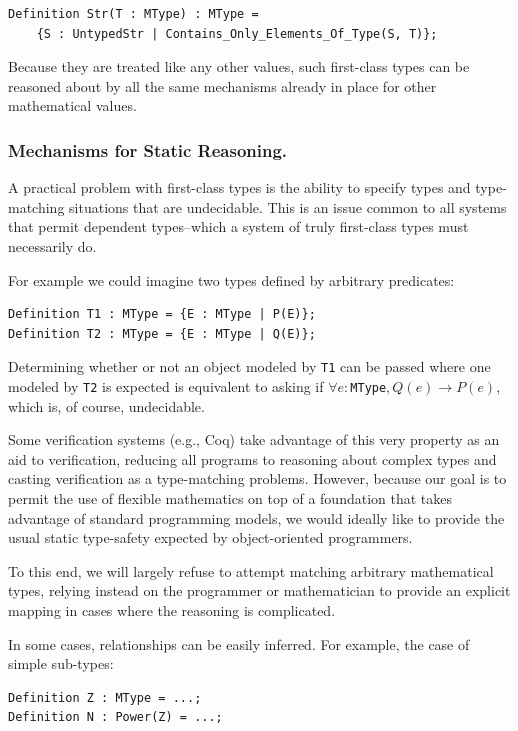 \begin{lstlisting}
Definition Str(T : MType) : MType = 
	{S : UntypedStr | Contains_Only_Elements_Of_Type(S, T)};
\end{lstlisting}

Because they are treated like any other values, such first-class types can be reasoned about by all the same mechanisms already in place for other mathematical values.

\subsubsection{Mechanisms for Static Reasoning.}\label{sec:staticreasoning}
A practical problem with first-class types is the ability to specify types and type-matching situations that are undecidable.  This is an issue common to all systems that permit dependent types--which a system of truly first-class types must necessarily do.

For example we could imagine two types defined by arbitrary predicates:

\begin{lstlisting}
Definition T1 : MType = {E : MType | P(E)};
Definition T2 : MType = {E : MType | Q(E)};
\end{lstlisting}

Determining whether or not an object modeled by \texttt{T1} can be passed where one modeled by \texttt{T2} is expected is equivalent to asking if $\forall e : $\texttt{MType}$, Q(e) \rightarrow P(e)$, which is, of course, undecidable.

Some verification systems (e.g., Coq) take advantage of this very property as an aid to verification, reducing all programs to reasoning about complex types and casting verification as a type-matching problems.  However, because our goal is to permit the use of flexible mathematics on top of a foundation that takes advantage of standard programming models, we would ideally like to provide the usual static type-safety expected by object-oriented programmers.

To this end, we will largely refuse to attempt matching arbitrary mathematical types, relying instead on the programmer or mathematician to provide an explicit mapping in cases where the reasoning is complicated.

In some cases, relationships can be easily inferred.  For example, the case of simple sub-types:

\begin{lstlisting}
Definition Z : MType = ...;
Definition N : Power(Z) = ...;
\end{lstlisting}


